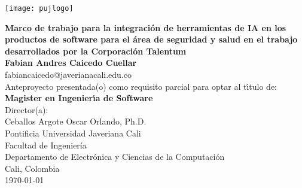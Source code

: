 \begin{center}
\thispagestyle{empty}
\vspace*{-2.2cm}
\begin{center}
    \texttt{[image: pujlogo]}~\\[1cm]
\end{center}
\textbf{\huge
Marco de trabajo para la integración de herramientas de IA en los productos de software para el área de seguridad y salud en el trabajo desarrollados por la Corporación Talentum
}\\[1.2cm]

\Large\textbf{Fabian Andres Caicedo Cuellar}\\
\small fabiancaicedo@javerianacali.edu.co\\[1cm]
\small Anteproyecto presentada(o) como requisito parcial para optar al
t\'{\i}tulo de:\\
\textbf{Magister en Ingenier\'{\i}a de Software}\\[1cm]
Director(a):\\
Ceballos Argote Oscar Orlando, Ph.D.\\[1.2cm]

Pontificia Universidad Javeriana Cali\\
Facultad de Ingeniería\\
Departamento de Electrónica y Ciencias de la Computación\\
Cali, Colombia\\
\today\\
\end{center}

